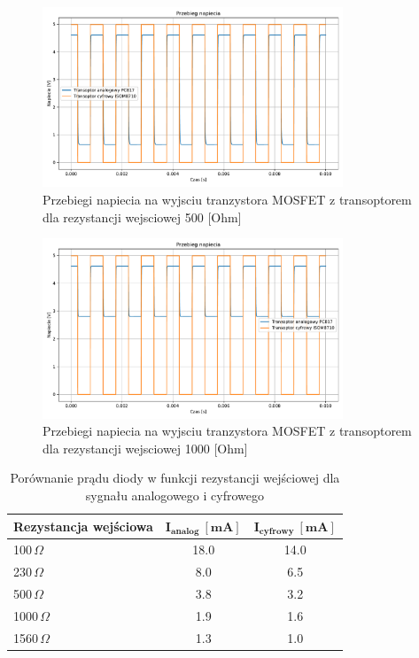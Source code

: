 \documentclass[11pt]{article}
\begin{document}
\begin{figure}[H]
\centering
\includegraphics[width=0.8\textwidth]{aun1_gate_circuit_digital_vs_analog_rin500ohm.pdf}
\caption{Przebiegi napiecia na wyjsciu tranzystora MOSFET z transoptorem dla rezystancji wejsciowej 500 [Ohm]}
\end{figure}

\begin{figure}[H]
\centering
\includegraphics[width=0.8\textwidth]{aun1_gate_circuit_digital_vs_analog_rin1000ohm.pdf}
\caption{Przebiegi napiecia na wyjsciu tranzystora MOSFET z transoptorem dla rezystancji wejsciowej 1000 [Ohm]}
\end{figure}

\begin{table}[H]
\centering
\begin{tabular}{|l|c|c|}
\hline
\textbf{Rezystancja wejściowa} & \(\mathbf{I_{analog} \ [mA]}\) & \(\mathbf{I_{cyfrowy} \ [mA]}\) \\
\hline
100\,$\Omega$ & 18.0 & 14.0 \\
\hline
230\,$\Omega$ & 8.0 & 6.5 \\
\hline
500\,$\Omega$ & 3.8 & 3.2 \\
\hline
1000\,$\Omega$ & 1.9 & 1.6 \\
\hline
1560\,$\Omega$ & 1.3 & 1.0 \\
\hline
\end{tabular}
\caption{Porównanie prądu diody w funkcji rezystancji wejściowej dla sygnału analogowego i cyfrowego}
\label{tab:diode_current_comparison}
\end{table}
\end{document}
